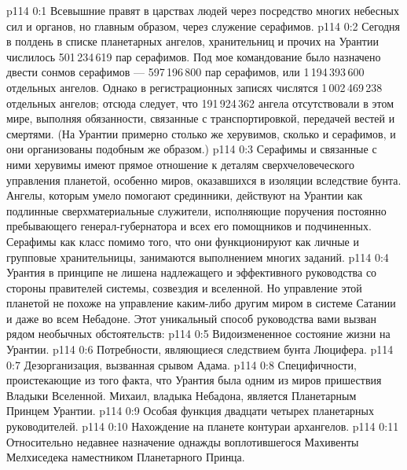 \vs p114 0:1 Всевышние правят в царствах людей через посредство многих небесных сил и органов, но главным образом, через служение серафимов.
\vs p114 0:2 Сегодня в полдень в списке планетарных ангелов, хранительниц и прочих на Урантии числилось 501\,234\,619 пар серафимов. Под мое командование было назначено двести сонмов серафимов --- 597\,196\,800 пар серафимов, или 1\,194\,393\,600 отдельных ангелов. Однако в регистрационных записях числятся 1\,002\,469\,238 отдельных ангелов; отсюда следует, что 191\,924\,362 ангела отсутствовали в этом мире, выполняя обязанности, связанные с транспортировкой, передачей вестей и смертями. (На Урантии примерно столько же херувимов, сколько и серафимов, и они организованы подобным же образом.)
\vs p114 0:3 Серафимы и связанные с ними херувимы имеют прямое отношение к деталям сверхчеловеческого управления планетой, особенно миров, оказавшихся в изоляции вследствие бунта. Ангелы, которым умело помогают срединники, действуют на Урантии как подлинные сверхматериальные служители, исполняющие поручения постоянно пребывающего генерал\hyp{}губернатора и всех его помощников и подчиненных. Серафимы как класс помимо того, что они функционируют как личные и групповые хранительницы, занимаются выполнением многих заданий.
\vs p114 0:4 Урантия в принципе не лишена надлежащего и эффективного руководства со стороны правителей системы, созвездия и вселенной. Но управление этой планетой не похоже на управление каким\hyp{}либо другим миром в системе Сатании и даже во всем Небадоне. Этот уникальный способ руководства вами вызван рядом необычных обстоятельств:
\vs p114 0:5 \bibnobreakspace Видоизмененное состояние жизни на Урантии.
\vs p114 0:6 \bibnobreakspace Потребности, являющиеся следствием бунта Люцифера.
\vs p114 0:7 \bibnobreakspace Дезорганизация, вызванная срывом Адама.
\vs p114 0:8 \bibnobreakspace Специфичности, проистекающие из того факта, что Урантия была одним из миров пришествия Владыки Вселенной. Михаил, владыка Небадона, является Планетарным Принцем Урантии.
\vs p114 0:9 \bibnobreakspace Особая функция двадцати четырех планетарных руководителей.
\vs p114 0:10 \bibnobreakspace Нахождение на планете контураи архангелов.
\vs p114 0:11 \bibnobreakspace Относительно недавнее назначение однажды воплотившегося Махивенты Мелхиседека наместником Планетарного Принца.
